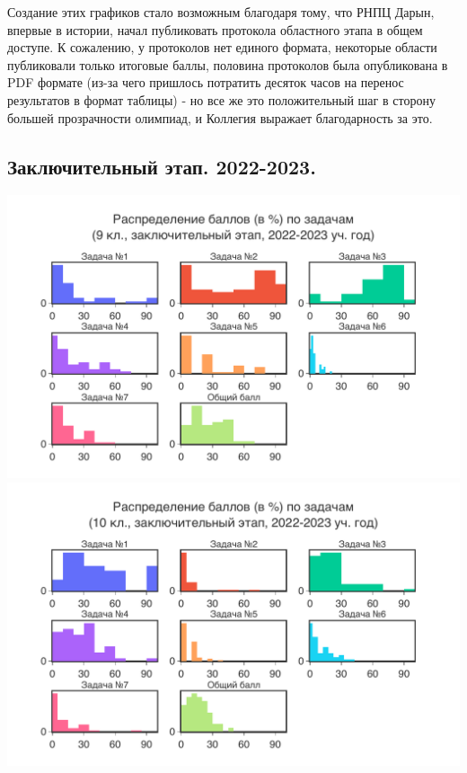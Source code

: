 Создание этих графиков стало возможным благодаря тому, что РНПЦ Дарын, впервые в истории, начал публиковать протокола областного этапа в общем доступе. К сожалению, у протоколов нет единого формата, некоторые области публиковали только итоговые баллы, половина протоколов была опубликована в PDF формате (из-за чего пришлось потратить десяток часов на перенос результатов в формат таблицы) - но все же это положительный шаг в сторону большей прозрачности олимпиад, и Коллегия выражает благодарность за это. 
\newpage
\subsection{Заключительный этап. 2022-2023.}

\includegraphics[width=\linewidth]{../export/pdf/results/2023/respa/grade9-dist-problemwise.pdf}
\includegraphics[width=\linewidth]{../export/pdf/results/2023/respa/grade10-dist-problemwise.pdf}
